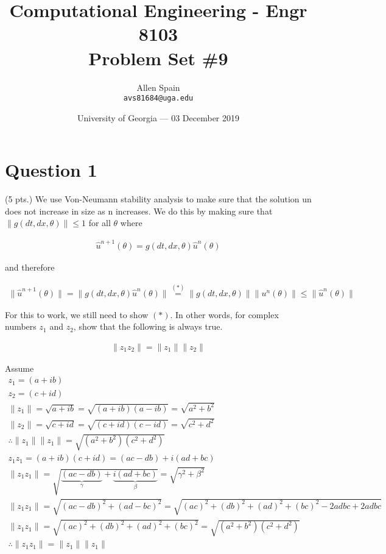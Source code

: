 \documentclass{article}
\title{Computational Engineering - Engr 8103 \\ Problem Set \#9} %
\author{Allen Spain\\ \texttt{avs81684@uga.edu}} %
\date{University of Georgia --- 03 December 2019 } %
\begin{document}
\maketitle %


\section*{Question 1} %
(5 pts.) We use Von-Neumann stability analysis to make sure that the solution un does not increase in size as n increases. We do this by making sure that $\| g(dt, dx, \theta) \| \leq 1 $ for all $\theta $ where

\begin{gather*}
 \hat{u}^{n+1}(\theta) = g(dt, dx, \theta) \hat{u}^{n}(\theta)
\end{gather*}

and therefore

\begin{gather*}
 \|\hat{u}^{n+1}(\theta)\| = \|g(dt,dx,\theta)\hat{u}^{n}(\theta)\| \stackrel{(*)}{=} \|g(dt,dx,\theta)\| \|u^{n}(\theta) \| \leq \| \hat{u}^{n}(\theta) \|
\end{gather*}

For this to work, we still need to show $ ( \ast ) $. In other words, for complex numbers $z_{1}$ and $z_{2}$,
show that the following is always true.

\begin{gather*}
	\| z_{1}z_{2} \| = \| z_{1} \| \|z_{2}\|
\end{gather*}

Assume
\begin{gather*}
	z_{1} = (a + ib)\\ z_{2}  = (c + id) \\
	\| z_{1} \| = \sqrt{a + ib} = \sqrt{(a + ib)(a - ib)} = \sqrt{a^{2} + b^{2}}\\
	\| z_{2} \| = \sqrt{c + id} = \sqrt{(c + id)(c - id)} = \sqrt{c^{2} + d^{2}} \\
	\therefore \| z_{1} \| \| z_{1} \| =  \sqrt{( a^{2} + b^{2} )(c^{2} + d^{2})} \\
	z_{1} z_{1} = (a + ib)(c + id) = (ac - db) + i(ad + bc)\\
	\| z_{1} z_{1} \| = \sqrt{\underbrace{(ac - db)}_{\text{$\gamma$}} + \underbrace{i(ad + bc)}_{\text{$\beta$}}} = \sqrt{\gamma^{2} + \beta^{2}}\\
	\| z_{1} z_{1} \|  = \sqrt{(ac - db)^{2} + (ad - bc)^{2}} = \sqrt{(ac)^{2} + (db)^{2} + (ad)^{2} + (bc)^{2} - 2adbc + 2adbc}\\
	\| z_{1} z_{1} \| = \sqrt{(ac)^{2} +(db)^2 + (ad)^{2} + (bc)^{2}} = \sqrt{(a^{2} + b^{2})(c^{2} + d^{2})}\\
	\therefore \| z_{1} z_{1} \| = \| z_{1} \| \| z_{1} \|
\end{gather*}
\end{document}
